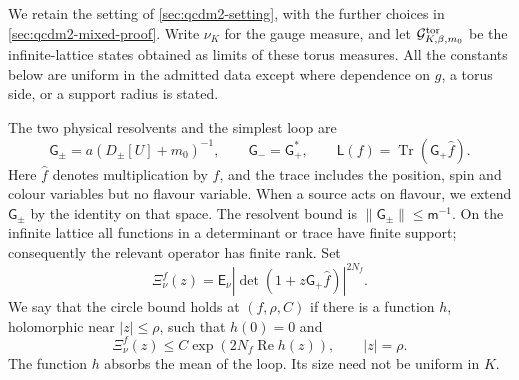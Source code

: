 \documentclass[11pt,letterpaper,reqno]{amsart}
\theoremstyle{definition}
\theoremstyle{remark}
\begin{document}
We retain the setting of \cref{sec:qcdm2-setting}, with the
further choices in \cref{sec:qcdm2-mixed-proof}.
Write $\nu_K$ for the
gauge measure, and let $\mathcal G^{\rm tor}_{K,\beta,m_0}$ be the
infinite-lattice states obtained as limits of these torus measures.
All the constants below are uniform in the admitted data except
where dependence on $g$, a torus side, or a support radius is stated.

The two physical resolvents and the simplest loop are
\[
 \mathsf G_\pm=a(D_\pm[U]+m_0)^{-1},\qquad
 \mathsf G_-=\mathsf G_+^*,\qquad
 \mathsf L(f)=\operatorname{Tr}(\mathsf G_+\hat f).
\]
Here $\hat f$ denotes multiplication by $f$, and the trace includes
the position, spin and colour variables but no flavour variable.
When a source acts on flavour, we extend $\mathsf G_\pm$
by the identity on that space.
The resolvent bound is $\|\mathsf G_\pm\|\le\mathsf m^{-1}$.
On the infinite lattice all functions in a determinant or trace
have finite support; consequently the relevant operator has finite
rank.  Set
\begin{equation}\label{eq:qcdm2-Xi}
 \Xi_\nu^f(z)=\mathsf E_\nu
       |\det(1+z\mathsf G_+\hat f)|^{2N_f}.
\end{equation}
We say that the circle bound holds at $(f,\rho,C)$ if there is a
function $h$, holomorphic near $|z|\le\rho$, such that $h(0)=0$ and
\begin{equation}\label{C-414-10}
 \Xi_\nu^f(z)\le C\exp(2N_f\operatorname{Re}h(z)),
 \qquad |z|=\rho.
\end{equation}
The function $h$ absorbs the mean of the loop.  Its size need not
be uniform in $K$.
\end{document}
